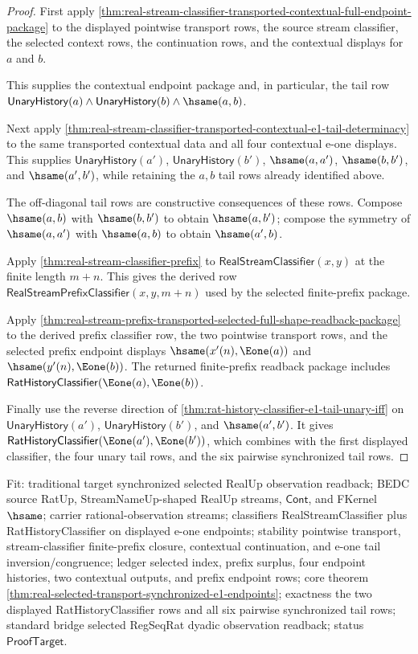 \begin{proof}
First apply
\autoref{thm:real-stream-classifier-transported-contextual-full-endpoint-package}
to the displayed pointwise transport rows, the source stream classifier, the
selected context rows, the continuation rows, and the contextual displays for
$a$ and $b$.

This supplies the contextual endpoint package and, in particular, the tail row
$\mathsf{UnaryHistory}(a)\land\mathsf{UnaryHistory}(b)\land
\hsame(a,b)$.

Next apply
\autoref{thm:real-stream-classifier-transported-contextual-e1-tail-determinacy}
to the same transported contextual data and all four contextual e-one displays.
This supplies $\mathsf{UnaryHistory}(a')$, $\mathsf{UnaryHistory}(b')$,
$\hsame(a,a')$, $\hsame(b,b')$, and $\hsame(a',b')$, while retaining the
$a,b$ tail rows already identified above.

The off-diagonal tail rows are constructive consequences of these rows. Compose
$\hsame(a,b)$ with $\hsame(b,b')$ to obtain $\hsame(a,b')$; compose the
symmetry of $\hsame(a,a')$ with $\hsame(a,b)$ to obtain $\hsame(a',b)$.

Apply \autoref{thm:real-stream-classifier-prefix} to
$\mathsf{RealStreamClassifier}(x,y)$ at the finite length $m+n$. This gives the
derived row $\mathsf{RealStreamPrefixClassifier}(x,y,m+n)$ used by the selected
finite-prefix package.

Apply
\autoref{thm:real-stream-prefix-transported-selected-full-shape-readback-package}
to the derived prefix classifier row, the two pointwise transport rows, and the
selected prefix endpoint displays $\hsame(x'(n),\Eone(a))$ and
$\hsame(y'(n),\Eone(b))$. The returned finite-prefix readback package includes
$\mathsf{RatHistoryClassifier}(\Eone(a),\Eone(b))$.

Finally use the reverse direction of
\autoref{thm:rat-history-classifier-e1-tail-unary-iff} on
$\mathsf{UnaryHistory}(a')$, $\mathsf{UnaryHistory}(b')$, and
$\hsame(a',b')$. It gives
$\mathsf{RatHistoryClassifier}(\Eone(a'),\Eone(b'))$, which combines with the
first displayed classifier, the four unary tail rows, and the six pairwise
synchronized tail rows.
\end{proof}

Fit: traditional target synchronized selected RealUp observation readback; BEDC
source RatUp, StreamNameUp-shaped RealUp streams, $\mathsf{Cont}$, and FKernel
$\hsame$; carrier rational-observation streams; classifiers
RealStreamClassifier plus RatHistoryClassifier on displayed e-one endpoints;
stability pointwise transport, stream-classifier finite-prefix closure,
contextual continuation, and e-one tail inversion/congruence; ledger selected
index, prefix surplus, four endpoint histories, two contextual outputs, and prefix
endpoint rows; core theorem
\autoref{thm:real-selected-transport-synchronized-e1-endpoints}; exactness the
two displayed RatHistoryClassifier rows and all six pairwise synchronized tail
rows;
standard bridge selected RegSeqRat dyadic observation readback; status
$\mathsf{ProofTarget}$.

